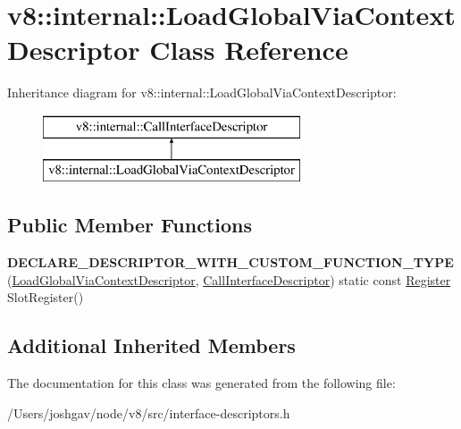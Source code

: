 \hypertarget{classv8_1_1internal_1_1_load_global_via_context_descriptor}{}\section{v8\+:\+:internal\+:\+:Load\+Global\+Via\+Context\+Descriptor Class Reference}
\label{classv8_1_1internal_1_1_load_global_via_context_descriptor}
Inheritance diagram for v8\+:\+:internal\+:\+:Load\+Global\+Via\+Context\+Descriptor\+:\begin{figure}[H]
\begin{center}
\leavevmode
\includegraphics[height=2.000000cm]{classv8_1_1internal_1_1_load_global_via_context_descriptor}
\end{center}
\end{figure}
\subsection*{Public Member Functions}
\begin{DoxyCompactItemize}
\item 
{\bfseries D\+E\+C\+L\+A\+R\+E\+\_\+\+D\+E\+S\+C\+R\+I\+P\+T\+O\+R\+\_\+\+W\+I\+T\+H\+\_\+\+C\+U\+S\+T\+O\+M\+\_\+\+F\+U\+N\+C\+T\+I\+O\+N\+\_\+\+T\+Y\+PE} (\hyperlink{classv8_1_1internal_1_1_load_global_via_context_descriptor}{Load\+Global\+Via\+Context\+Descriptor}, \hyperlink{classv8_1_1internal_1_1_call_interface_descriptor}{Call\+Interface\+Descriptor}) static const \hyperlink{structv8_1_1internal_1_1_register}{Register} Slot\+Register()\hypertarget{classv8_1_1internal_1_1_load_global_via_context_descriptor_a1272c530d5a86f61168ca34225f47d86}{}\label{classv8_1_1internal_1_1_load_global_via_context_descriptor_a1272c530d5a86f61168ca34225f47d86}

\end{DoxyCompactItemize}
\subsection*{Additional Inherited Members}


The documentation for this class was generated from the following file\+:\begin{DoxyCompactItemize}
\item 
/\+Users/joshgav/node/v8/src/interface-\/descriptors.\+h\end{DoxyCompactItemize}
